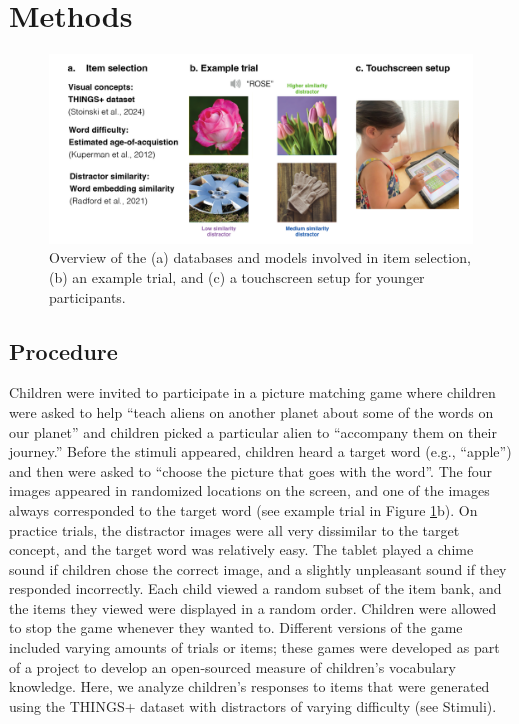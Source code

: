 \documentclass[
  man,mask]{apa6}
\begin{document}
\section{Methods}\label{methods}

\begin{figure}[H]

{\centering \includegraphics[width=1\linewidth]{visvocab-overview} 

}

\caption{Overview of the (a) databases and models involved in item selection, (b) an example trial, and (c) a touchscreen setup for younger participants. }\label{fig:procedure-figure}
\end{figure}

\subsection{Procedure}\label{procedure}

Children were invited to participate in a picture matching game where children were asked to help ``teach aliens on another planet about some of the words on our planet'' and children picked a particular alien to ``accompany them on their journey.'' Before the stimuli appeared, children heard a target word (e.g., ``apple'') and then were asked to ``choose the picture that goes with the word''. The four images appeared in randomized locations on the screen, and one of the images always corresponded to the target word (see example trial in Figure \ref{fig:procedure-figure}b). On practice trials, the distractor images were all very dissimilar to the target concept, and the target word was relatively easy. The tablet played a chime sound if children chose the correct image, and a slightly unpleasant sound if they responded incorrectly. Each child viewed a random subset of the item bank, and the items they viewed were displayed in a random order. Children were allowed to stop the game whenever they wanted to. Different versions of the game included varying amounts of trials or items; these games were developed as part of a project to develop an open-sourced measure of children's vocabulary knowledge. Here, we analyze children's responses to items that were generated using the THINGS+ dataset with distractors of varying difficulty (see Stimuli).
\end{document}
